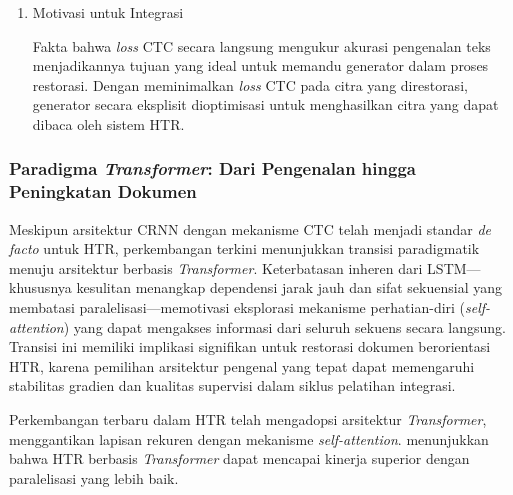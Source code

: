 \documentclass[12pt,a4paper]{article}
\begin{document}
\begin{enumerate}[leftmargin=*, labelindent=0pt, itemsep=1ex, topsep=0pt]
\begin{enumerate}[leftmargin=1.5em, labelsep=0.5em, itemindent=0pt, label=\alph*., topsep=0pt, parsep=0pt, itemsep=0pt]
      \item Propagasi Kesalahan dalam Lapisan Rekuren \mbox{}\\[0.1em]
            Lapisan LSTM meneruskan informasi lintas langkah waktu. Kesalahan atau ketidakpastian di langkah waktu awal dapat bertambah dan memengaruhi prediksi selanjutnya. Restorasi yang meningkatkan pengenalan karakter awal akan memiliki manfaat yang berantai.
\end{enumerate}

\item Motivasi untuk Integrasi

Fakta bahwa \textit{loss} CTC secara langsung mengukur akurasi pengenalan teks menjadikannya tujuan yang ideal untuk memandu generator dalam proses restorasi. Dengan meminimalkan \textit{loss} CTC pada citra yang direstorasi, generator secara eksplisit dioptimisasi untuk menghasilkan citra yang dapat dibaca oleh sistem HTR.

\end{enumerate}

\subsubsection{Paradigma \textit{Transformer}: Dari Pengenalan hingga Peningkatan Dokumen}
\label{subsubsec:transformer-htr}


Meskipun arsitektur CRNN dengan mekanisme CTC telah menjadi standar \textit{de facto} untuk HTR, perkembangan terkini menunjukkan transisi paradigmatik menuju arsitektur berbasis \textit{Transformer}. Keterbatasan inheren dari LSTM—khususnya kesulitan menangkap dependensi jarak jauh dan sifat sekuensial yang membatasi paralelisasi—memotivasi eksplorasi mekanisme perhatian-diri (\textit{self-attention}) yang dapat mengakses informasi dari seluruh sekuens secara langsung. Transisi ini memiliki implikasi signifikan untuk restorasi dokumen berorientasi HTR, karena pemilihan arsitektur pengenal yang tepat dapat memengaruhi stabilitas gradien dan kualitas supervisi dalam siklus pelatihan integrasi.

Perkembangan terbaru dalam HTR telah mengadopsi arsitektur \textit{Transformer}, menggantikan lapisan rekuren dengan mekanisme \textit{self-attention}. \parencite{diaz2021} menunjukkan bahwa HTR berbasis \textit{Transformer} dapat mencapai kinerja superior dengan paralelisasi yang lebih baik.
\end{document}
